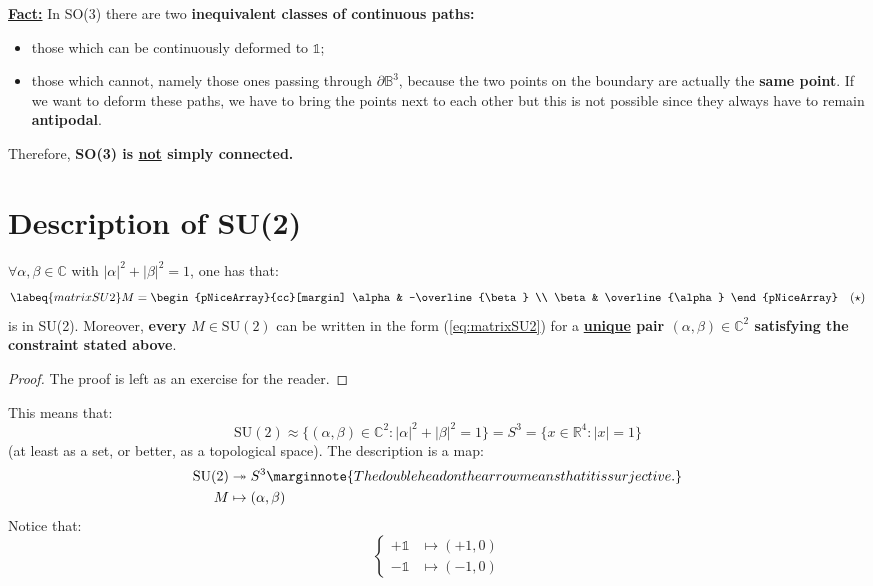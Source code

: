 \documentclass[../main.tex]{subfiles}
\begin{document}
\underline{\textbf{Fact:}} In SO(3) there are two \textbf{inequivalent classes of continuous paths:}
\begin{itemize}
    \item those which can be continuously deformed to $\mathbb{1}$;
    \item those which cannot, namely those ones passing through $\partial\mathbb{B}^3$, because the two points on the boundary are actually the \textbf{same point}. If we want to deform these paths, we have to bring the points next to each other but this is not possible since they always have to remain \textbf{antipodal}.
\end{itemize}
Therefore, \textbf{SO(3) is \underline{not} simply connected.}
\section{Description of SU(2)}
\begin{lemma}
$\forall\alpha,\beta\in\mathbb{C}$ with $|\alpha|^2+|\beta|^2=1$, one has that:
\begin{equation}\labeq{matrixSU2}
M=\begin{pNiceArray}{cc}[margin]
\alpha & -\overline{\beta} \\
\beta & \overline{\alpha}
\end{pNiceArray}
\quad (\star)
\end{equation}
is in SU(2). Moreover, \textbf{every} $M\in\textrm{SU}(2)$ can be written in the form (\ref{eq:matrixSU2}) for a \textbf{\underline{unique} pair $(\alpha,\beta)\in\mathbb{C}^2$ satisfying the constraint stated above}.
\end{lemma}
\begin{proof}
The proof is left as an exercise for the reader.
\end{proof}
This means that: 
\[
\textrm{SU}(2)\approx\{(\alpha,\beta)\in\mathbb{C}^2:|\alpha|^2+|\beta|^2=1\}=S^3=\{x\in\mathbb{R}^4:|x|=1\}
\]
(at least as a set, or better, as a topological space). The description is a map:
\begin{align*}
\text{SU(2)}&\twoheadrightarrow S^3\marginnote{The double head on the arrow means that it is surjective.}\\
M&\mapsto(\alpha,\beta)
\end{align*}
Notice that:
\[
\begin{cases}
+\mathbb{1}&\mapsto(+1,0)\\
-\mathbb{1}&\mapsto(-1,0)
\end{cases} 
\]
\end{document}
